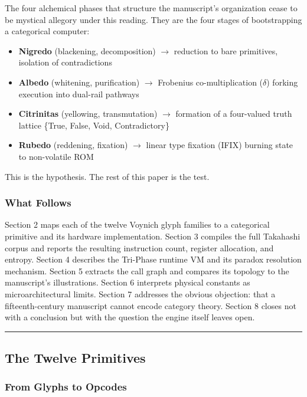 \documentclass[12pt,a4paper]{article}
\begin{document}
The four alchemical phases that structure the manuscript's organization cease to be mystical allegory under this reading. They are the four stages of bootstrapping a categorical computer:

\begin{itemize}
    \item \textbf{Nigredo} (blackening, decomposition) $\rightarrow$ reduction to bare primitives, isolation of contradictions
    \item \textbf{Albedo} (whitening, purification) $\rightarrow$ Frobenius co-multiplication ($\delta$) forking execution into dual-rail pathways
    \item \textbf{Citrinitas} (yellowing, transmutation) $\rightarrow$ formation of a four-valued truth lattice \{True, False, Void, Contradictory\}
    \item \textbf{Rubedo} (reddening, fixation) $\rightarrow$ linear type fixation (IFIX) burning state to non-volatile ROM
\end{itemize}

This is the hypothesis. The rest of this paper is the test.

\subsubsection{What Follows}

Section 2 maps each of the twelve Voynich glyph families to a categorical primitive and its hardware implementation. Section 3 compiles the full Takahashi corpus and reports the resulting instruction count, register allocation, and entropy. Section 4 describes the Tri-Phase runtime VM and its paradox resolution mechanism. Section 5 extracts the call graph and compares its topology to the manuscript's illustrations. Section 6 interprets physical constants as microarchitectural limits. Section 7 addresses the obvious objection: that a fifteenth-century manuscript cannot encode category theory. Section 8 closes not with a conclusion but with the question the engine itself leaves open.

\begin{center}
\rule{0.5\textwidth}{0.4pt}
\end{center}

\subsection{The Twelve Primitives}

\subsubsection{From Glyphs to Opcodes}
\end{document}
